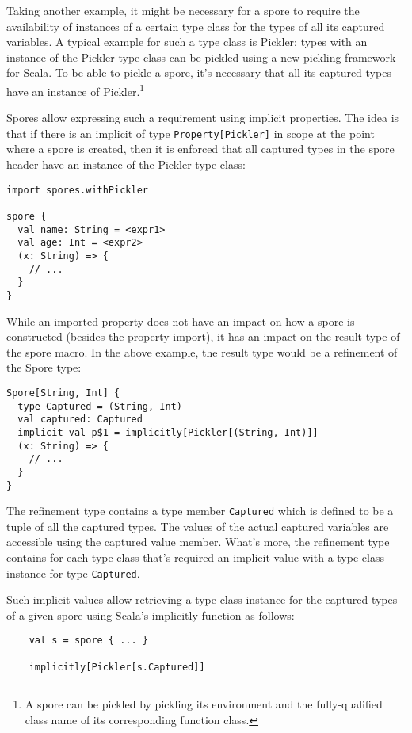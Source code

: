 Taking another example, it might be necessary for a spore to require the
availability of instances of a certain type class for the types of all its
captured variables. A typical example for such a type class is Pickler: types
with an instance of the Pickler type class can be pickled using a new pickling
framework for Scala. To be able to pickle a spore, it's necessary that all its
captured types have an instance of Pickler.\footnote{A spore can be pickled by
pickling its environment and the fully-qualified class name of its corresponding
function class.}

Spores allow expressing such a requirement using implicit properties. The idea
is that if there is an implicit of type \verb|Property[Pickler]| in scope at the
point where a spore is created, then it is enforced that all captured types in
the spore header have an instance of the Pickler type class:

\begin{verbatim}
import spores.withPickler

spore {
  val name: String = <expr1>
  val age: Int = <expr2>
  (x: String) => {
    // ...
  }
}
\end{verbatim}

While an imported property does not have an impact on how a spore is constructed
(besides the property import), it has an impact on the result type of the spore
macro. In the above example, the result type would be a refinement of the Spore
type:

\begin{verbatim}
Spore[String, Int] {
  type Captured = (String, Int)
  val captured: Captured
  implicit val p$1 = implicitly[Pickler[(String, Int)]]
  (x: String) => {
    // ...
  }
}
\end{verbatim}

The refinement type contains a type member \verb|Captured| which is defined to
be a tuple of all the captured types. The values of the actual captured
variables are accessible using the captured value member. What's more, the
refinement type contains for each type class that's required an implicit value
with a type class instance for type \verb|Captured|.

Such implicit values allow retrieving a type class instance for the captured
types of a given spore using Scala's implicitly function as follows:

\begin{verbatim}
    val s = spore { ... }

    implicitly[Pickler[s.Captured]]
\end{verbatim}

